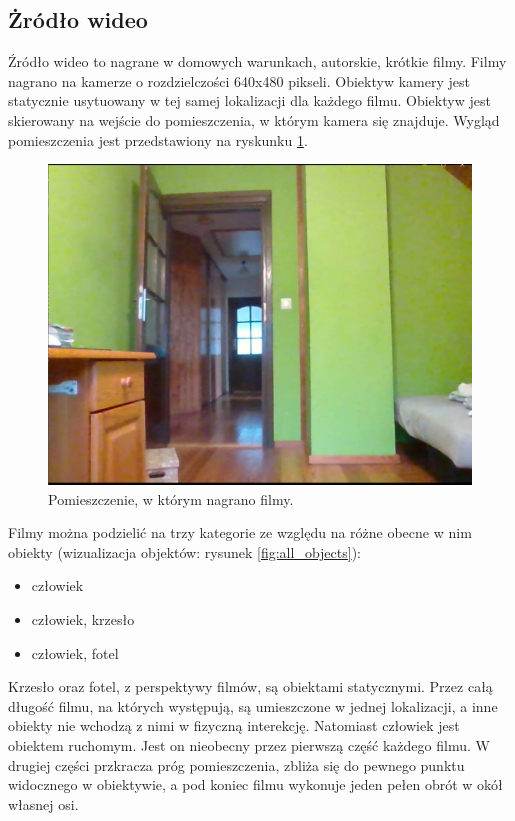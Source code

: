 \subsection{Żródło wideo}
\label{sec:zrodlo_wideo}
Źródło wideo to nagrane w domowych warunkach, autorskie, krótkie filmy. Filmy nagrano na kamerze o rozdzielczości 640x480 pikseli. Obiektyw kamery jest statycznie usytuowany w tej samej lokalizacji dla każdego filmu. Obiektyw jest skierowany na wejście do pomieszczenia, w którym kamera się znajduje. Wygląd pomieszczenia jest przedstawiony na ryskunku \ref{fig:test-dokladnosc-scena}.

\begin{figure}[H]
    \centering
    \includegraphics[width=\linewidth]{r_test_dokładności/vid_pics/1_1.jpg}
    \caption{Pomieszczenie, w którym nagrano filmy.}
    \label{fig:test-dokladnosc-scena}
\end{figure}


Filmy można podzielić na trzy kategorie ze względu na różne obecne w nim obiekty (wizualizacja objektów: rysunek \ref{fig:all_objects}):
\begin{itemize}
    \item człowiek
    \item człowiek, krzesło
    \item człowiek, fotel
\end{itemize}
Krzesło oraz fotel, z perspektywy filmów, są obiektami statycznymi. Przez całą długość filmu, na których występują, są umieszczone w jednej lokalizacji, a inne obiekty nie wchodzą z nimi w fizyczną interekcję.
Natomiast człowiek jest obiektem ruchomym. Jest on nieobecny przez pierwszą część każdego filmu. W drugiej części przkracza próg pomieszczenia, zbliża się do pewnego punktu widocznego w obiektywie, a pod koniec filmu wykonuje jeden pełen obrót w okół własnej osi. 


